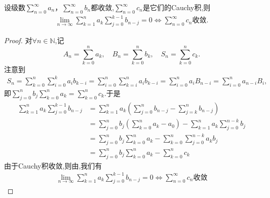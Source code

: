\documentclass[../../main.tex]{subfiles}%
\begin{document}
\begin{proposition}\label{proposition:命题EQ:13---92788648184FDAG.....2}
设级数\(\sum_{n = 0}^{\infty} a_n\)，\(\sum_{n = 0}^{\infty} b_n\)都收敛,\(\sum_{n = 0}^{\infty} c_n\)是它们的Cauchy积,则
\begin{align}
\lim\limits_{n\to\infty} \sum\limits_{k=1}^{n} a_k \sum\limits_{j=0}^{k-1} b_{n-j} = 0 \iff \sum\limits_{n=0}^{\infty} c_n \text{收敛}.
\end{align}
\end{proposition}
\begin{proof}
对$\forall n\in \mathbb{N}$,记
\[
A_n = \sum_{k = 0}^{n} a_k,\quad B_n = \sum_{k = 0}^{n} b_k,\quad S_n = \sum_{k = 0}^{n} c_k.
\]
注意到
\begin{align*}
S_n = \sum\limits_{k=0}^{n} \sum\limits_{i=0}^{k} a_i b_{k-i} = \sum\limits_{i=0}^{n} \sum\limits_{k=i}^{n} a_i b_{k-i} = \sum\limits_{i=0}^{n} a_i B_{n-i} = \sum\limits_{i=0}^{n} a_{n-i} B_i,
\end{align*}
即$\sum\limits_{j=0}^{n} b_j \sum\limits_{k=0}^{n} a_k =\sum\limits_{k=0}^{n} c_k.$于是
\begin{align*}
\sum\limits_{k=1}^{n} a_k \sum\limits_{j=0}^{k-1} b_{n-j} &= \sum\limits_{k=1}^{n} a_k \left( \sum\limits_{j=0}^{n} b_{n-j} - \sum\limits_{j=k}^{n} b_{n-j} \right) \\
&= \sum\limits_{j=0}^{n} b_j \left( \sum\limits_{k=0}^{n} a_k - a_0 \right) - \sum\limits_{k=1}^{n} a_k \sum\limits_{j=0}^{n-k} b_j \\
&= \sum\limits_{j=0}^{n} b_j \sum\limits_{k=0}^{n} a_k - \sum\limits_{k=0}^{n} \sum\limits_{j=0}^{n-k} a_k b_j \\
&= \sum\limits_{j=0}^{n} b_j \sum\limits_{k=0}^{n} a_k - \sum\limits_{k=0}^{n} c_k
\end{align*}
由于Cauchy积收敛,则由,我们有
\begin{align*}
\lim\limits_{n\to\infty} \sum\limits_{k=1}^{n} a_k \sum\limits_{j=0}^{k-1} b_{n-j} = 0 \iff \sum\limits_{n=0}^{\infty} c_n \text{收敛}
\end{align*}
\end{proof}
\end{document}
